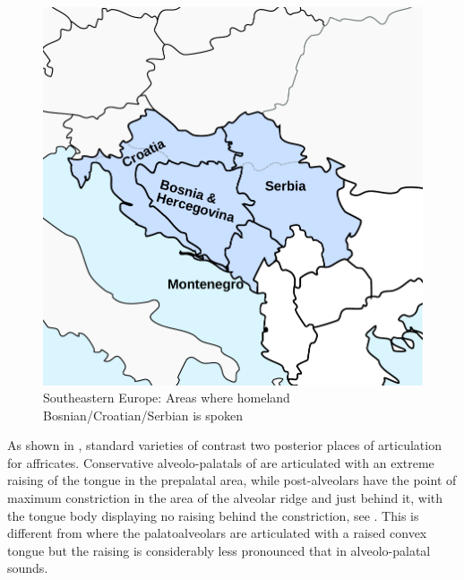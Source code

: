 \documentclass[output=paper,modfonts,newtxmath,hidelinks,]{langscibook}
\begin{document}
\begin{figure}
\includegraphics[height=.3\textheight]{figures/balkans.pdf}
\caption{\label{fig:mihajlovic:1}Southeastern Europe: Areas where homeland Bosnian/Croatian/Serbian is spoken}
\end{figure}

As shown in , standard varieties of  contrast two posterior places of articulation for affricates. Conservative alveolo-palatals of  are articulated with an extreme raising of the tongue in the prepalatal area, while post-alveolars have the point of maximum constriction in the area of the alveolar ridge and just behind it, with the tongue body displaying no raising behind the constriction, see . This is different from  where the palatoalveolars are articulated with a raised convex tongue but the raising is considerably less pronounced that in  alveolo-palatal sounds.
\end{document}
